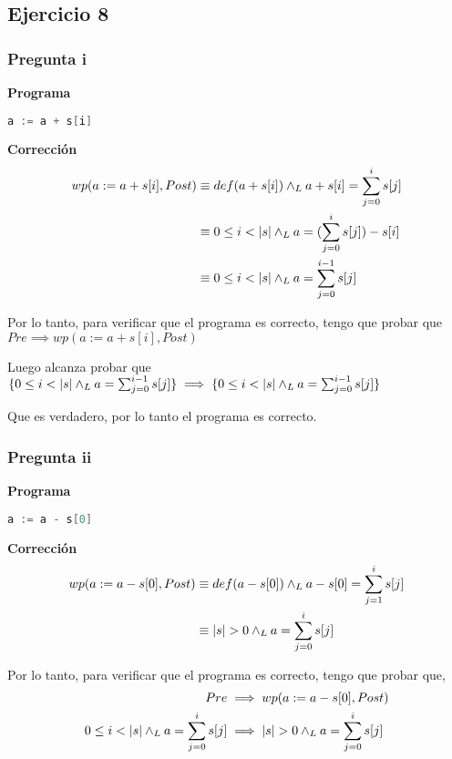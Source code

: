 \subsection{Ejercicio 8}

\subsubsection{Pregunta i}
\textbf{Programa}

\begin{lstlisting}[language = C++]
    a := a + s[i]
\end{lstlisting}

\textbf{Corrección}
\begin{align*}
    wp(a := a + s[i], Post) &\equiv def(a + s[i]) \land _L a + s[i] = \sum_{j=0}^{i}s[j] \\
    &\equiv 0 \leq i < |s| \land _L a = (\sum_{j=0}^{i}s[j]) - s[i] \\
    &\equiv 0 \leq i < |s| \land _L a = \sum_{j=0}^{i-1}s[j] \\
\end{align*}

Por lo tanto, para verificar que el programa es correcto, tengo que probar que $ Pre \implies wp(a := a + s[i], Post) $

Luego alcanza probar que $ \{ 0 \leq i < |s| \land _L a = \sum_{j=0}^{i-1}s[j] \} \implies \{ 0 \leq i < |s| \land _L a = \sum_{j=0}^{i-1}s[j] \} $

Que es verdadero, por lo tanto el programa es correcto.

\subsubsection{Pregunta ii}

\textbf{Programa}

\begin{lstlisting}[language = C++]
    a := a - s[0]
\end{lstlisting}

\textbf{Corrección}
\begin{align*}
    wp(a := a - s[0], Post) &\equiv def(a - s[0]) \land _L a - s[0] = \sum_{j = 1}^{i}s[j] \\
    &\equiv |s| > 0 \land _L a = \sum_{j = 0}^{i}s[j]
\end{align*}

Por lo tanto, para verificar que el programa es correcto, tengo que probar que,
\begin{align*}
    Pre &\implies wp(a := a - s[0], Post) \\
    0 \leq i < |s| \land _L a = \sum_{j = 0}^{i}s[j] &\implies |s| > 0 \land _L a = \sum_{j = 0}^{i}s[j]
\end{align*}

